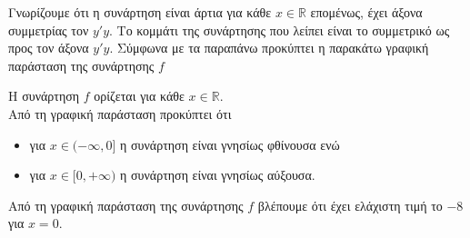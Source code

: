 \begin{alist}
\item Γνωρίζουμε ότι η συνάρτηση είναι άρτια για κάθε $x \in \mathbb{R}$ επομένως, έχει άξονα συμμετρίας τον $y'y$. Το κομμάτι της συνάρτησης που λείπει είναι το συμμετρικό ως προς τον άξονα $y'y$. Σύμφωνα με τα παραπάνω προκύπτει η παρακάτω γραφική παράσταση της συνάρτησης $f$
\begin{center}
\end{center}
\item
\begin{rlist}
\item Η συνάρτηση $f$ ορίζεται για κάθε $x \in \mathbb{R}$. \\
Από τη γραφική παράσταση προκύπτει ότι
\begin{itemize}
    \item για $x \in (-\infty, 0]$ η συνάρτηση είναι γνησίως φθίνουσα ενώ
    \item για $x \in [0, +\infty)$ η συνάρτηση είναι γνησίως αύξουσα.
\end{itemize}
\item Από τη γραφική παράσταση της συνάρτησης $f$ βλέπουμε ότι έχει ελάχιστη τιμή το $-8$ για $x=0$.
\end{rlist}
\end{alist}

